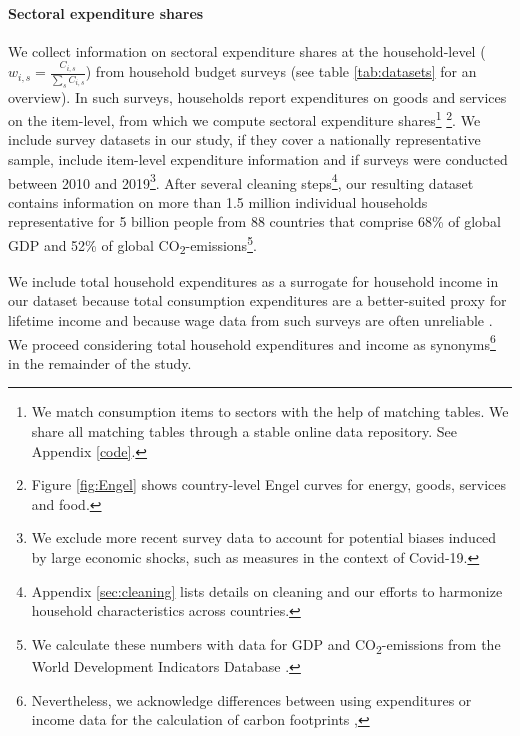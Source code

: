 \documentclass[12pt, a4paper]{article}
\begin{document}
\paragraph{Sectoral expenditure shares} We collect information on sectoral expenditure shares at the household-level ($w_{i,s}=\frac{C_{i,s}}{\sum_{s}C_{i,s}}$) from household budget surveys (see table \ref{tab:datasets} for an overview). In such surveys, households report expenditures on goods and services on the item-level, from which we compute sectoral expenditure shares\footnote{We match consumption items to sectors with the help of matching tables. We share all matching tables through a stable online data repository. See Appendix \ref{code}.} \footnote{Figure \ref{fig:Engel} shows country-level Engel curves for energy, goods, services and food.}. We include survey datasets in our study, if they cover a nationally representative sample, include item-level expenditure information and if surveys were conducted between 2010 and 2019\footnote{We exclude more recent survey data to account for potential biases induced by large economic shocks, such as measures in the context of Covid-19.}. After several cleaning steps\footnote{Appendix \ref{sec:cleaning} lists details on cleaning and our efforts to harmonize household characteristics across countries.}, our resulting dataset contains information on more than 1.5 million individual households representative for 5 billion people from 88 countries that comprise 68\% of global GDP and 52\% of global CO\textsubscript{2}-emissions\footnote{We calculate these numbers with data for GDP and CO\textsubscript{2}-emissions from the World Development Indicators Database \autocite{WorldBankGroup.2023}.}.

We include total household expenditures as a surrogate for household income in our dataset because total consumption expenditures are a better-suited proxy for lifetime income \autocite{Poterba.1989,Poterba.1991,Cronin.2019} and because wage data from such surveys are often unreliable \autocite{Blundell.1998}. We proceed considering total household expenditures and income as synonyms\footnote{Nevertheless, we acknowledge differences between using expenditures or income data for the calculation of carbon footprints \autocite[see][]{Levay.2023},} in the remainder of the study.
\end{document}
